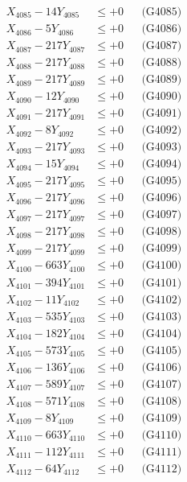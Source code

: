 \documentclass[a4paper,10pt]{article}
\begin{document}
{\begin{align}
X_{4085} - 14Y_{4085} &\leq +0 && \text{(G4085)} \\
X_{4086} - 5Y_{4086} &\leq +0 && \text{(G4086)} \\
X_{4087} - 217Y_{4087} &\leq +0 && \text{(G4087)} \\
X_{4088} - 217Y_{4088} &\leq +0 && \text{(G4088)} \\
X_{4089} - 217Y_{4089} &\leq +0 && \text{(G4089)} \\
X_{4090} - 12Y_{4090} &\leq +0 && \text{(G4090)} \\
\allowbreak
X_{4091} - 217Y_{4091} &\leq +0 && \text{(G4091)} \\
X_{4092} - 8Y_{4092} &\leq +0 && \text{(G4092)} \\
X_{4093} - 217Y_{4093} &\leq +0 && \text{(G4093)} \\
X_{4094} - 15Y_{4094} &\leq +0 && \text{(G4094)} \\
X_{4095} - 217Y_{4095} &\leq +0 && \text{(G4095)} \\
X_{4096} - 217Y_{4096} &\leq +0 && \text{(G4096)} \\
X_{4097} - 217Y_{4097} &\leq +0 && \text{(G4097)} \\
X_{4098} - 217Y_{4098} &\leq +0 && \text{(G4098)} \\
X_{4099} - 217Y_{4099} &\leq +0 && \text{(G4099)} \\
X_{4100} - 663Y_{4100} &\leq +0 && \text{(G4100)} \\
\allowbreak
X_{4101} - 394Y_{4101} &\leq +0 && \text{(G4101)} \\
X_{4102} - 11Y_{4102} &\leq +0 && \text{(G4102)} \\
X_{4103} - 535Y_{4103} &\leq +0 && \text{(G4103)} \\
X_{4104} - 182Y_{4104} &\leq +0 && \text{(G4104)} \\
X_{4105} - 573Y_{4105} &\leq +0 && \text{(G4105)} \\
X_{4106} - 136Y_{4106} &\leq +0 && \text{(G4106)} \\
X_{4107} - 589Y_{4107} &\leq +0 && \text{(G4107)} \\
X_{4108} - 571Y_{4108} &\leq +0 && \text{(G4108)} \\
X_{4109} - 8Y_{4109} &\leq +0 && \text{(G4109)} \\
X_{4110} - 663Y_{4110} &\leq +0 && \text{(G4110)} \\
\allowbreak
X_{4111} - 112Y_{4111} &\leq +0 && \text{(G4111)} \\
X_{4112} - 64Y_{4112} &\leq +0 && \text{(G4112)} \\

\end{align}}
\end{document}
